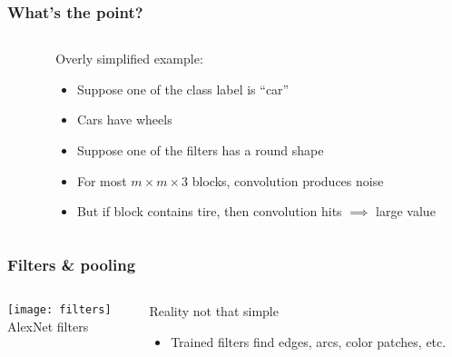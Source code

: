 \begin{frame}
    \frametitle{What's the point?}

    \begin{columns}
        \begin{column}{0.31\textwidth}
            
        \end{column}
        \begin{column}{0.69\textwidth}
            Overly simplified example:
            \begin{itemize}[<+->]
                \item Suppose one of the class label is ``car''
                \item Cars have wheels
                \item Suppose one of the filters has a round shape
                \item For most $m \times m \times 3$ blocks, convolution produces noise
                \item<10-> But if block contains tire, then convolution hits $\implies$ large value
            \end{itemize}
        \end{column}
    \end{columns}
\end{frame}

\begin{frame}
    \frametitle{Filters \& pooling}

    \begin{columns}
        \begin{column}{0.4\textwidth}
            \centering
            \texttt{[image: filters]} \\
            \footnotesize
            AlexNet filters \citep{KrizhevskyNIPS12}
        \end{column}

        \begin{column}{0.6\textwidth}
            Reality not that simple
            \begin{itemize}
                \item Trained filters find edges, arcs, color patches, etc.
            \end{itemize}
        \end{column}
    \end{columns}
\end{frame}

